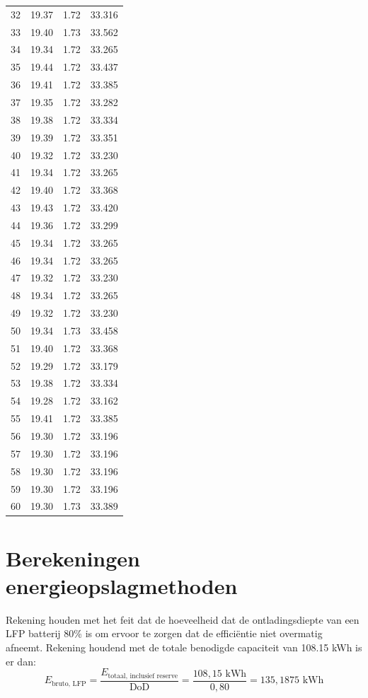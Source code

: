 \begin{table}[htbp]
\begin{tabular}{c S[table-format=2.2] S[table-format=1.2] S[table-format=2.3]}
32 & 19.37 & 1.72 & 33.316 \\
33 & 19.40 & 1.73 & 33.562 \\
34 & 19.34 & 1.72 & 33.265 \\
35 & 19.44 & 1.72 & 33.437 \\
36 & 19.41 & 1.72 & 33.385 \\
37 & 19.35 & 1.72 & 33.282 \\
38 & 19.38 & 1.72 & 33.334 \\
39 & 19.39 & 1.72 & 33.351 \\
40 & 19.32 & 1.72 & 33.230 \\
41 & 19.34 & 1.72 & 33.265 \\
42 & 19.40 & 1.72 & 33.368 \\
43 & 19.43 & 1.72 & 33.420 \\
44 & 19.36 & 1.72 & 33.299 \\
45 & 19.34 & 1.72 & 33.265 \\
46 & 19.34 & 1.72 & 33.265 \\
47 & 19.32 & 1.72 & 33.230 \\
48 & 19.34 & 1.72 & 33.265 \\
49 & 19.32 & 1.72 & 33.230 \\
50 & 19.34 & 1.73 & 33.458 \\
51 & 19.40 & 1.72 & 33.368 \\
52 & 19.29 & 1.72 & 33.179 \\
53 & 19.38 & 1.72 & 33.334 \\
54 & 19.28 & 1.72 & 33.162 \\
55 & 19.41 & 1.72 & 33.385 \\
56 & 19.30 & 1.72 & 33.196 \\
57 & 19.30 & 1.72 & 33.196 \\
58 & 19.30 & 1.72 & 33.196 \\
59 & 19.30 & 1.72 & 33.196 \\
60 & 19.30 & 1.73 & 33.389 \\
\bottomrule
\end{tabular}
\end{table}

\section{Berekeningen energieopslagmethoden}
Rekening houden met het feit dat de hoeveelheid dat de ontladingsdiepte van een LFP batterij 80\% is om ervoor te zorgen dat de efficiëntie niet overmatig afneemt. Rekening houdend met de totale benodigde capaciteit van 108.15 kWh is er dan: 
\begin{equation}
E_{\text{bruto, LFP}} = \frac{E_{\text{totaal, inclusief reserve}}}{\text{DoD}} = \frac{108{,}15 \text{ kWh}}{0{,}80} = 135{,}1875 \text{ kWh}
\end{equation}

